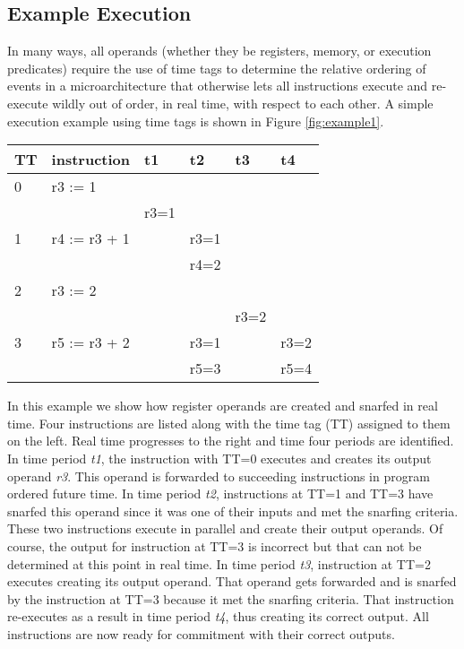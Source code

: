 \subsection{Example Execution}
%
In many ways, all operands (whether they be registers, memory,
or execution predicates) require the use of time tags to
determine the relative ordering of events in a microarchitecture
that otherwise lets all instructions execute and re-execute
wildly out of order, in real time, with respect to each other.
A simple execution example using time tags 
is shown in Figure \ref{fig:example1}.
%
\begin{figure*}
\centering
\begin{tabular}{|l|l|l|l|l|l|}
\hline
TT&instruction&t1&t2&t3&t4\\
\hline 
\hline 
0&r3 := 1&&&~~~~&\\
&&r3=1&&&\\
\hline 
1&r4 := r3 + 1&&r3=1&&~~~~\\
&&&r4=2&&\\
\hline 
2&r3 := 2&&&&~~~~\\
&&&&r3=2&\\
\hline 
3&r5 := r3 + 2&&r3=1&&r3=2\\
&&&r5=3&&r5=4\\
\hline 
\end{tabular}
\caption{{\em Example Instruction Execution.} The time tags for sequential
program instructions are on the left.  Real time is shown advancing
along the top.  For each real time interval, input operands are shown
above any output operands.}
\label{fig:example1}
\end{figure*}
%
In this example we show how register operands are created and
snarfed in real time.
Four instructions are listed along with the time tag (TT) assigned to them
on the left.  Real time progresses to the right and time four periods
are identified.  In time period \textit{t1}, the instruction with 
TT=0 executes and creates its output operand \textit{r3}.
This operand is forwarded to succeeding instructions in program
ordered future time.  In time period \textit{t2}, instructions
at TT=1 and TT=3 have snarfed this operand since it was one of
their inputs and met the snarfing criteria.  
These two instructions execute in parallel and
create their output operands.  Of course, the output for
instruction at TT=3 is incorrect but that can not be determined
at this point in real time.  In time period \textit{t3},
instruction at TT=2 executes creating its output operand.
That operand gets forwarded and is snarfed by the instruction at
TT=3 because it met the snarfing criteria.  That instruction
re-executes as a result in time period \textit{t4}, thus
creating its correct output.  All instructions are now ready
for commitment with their correct outputs.
%
